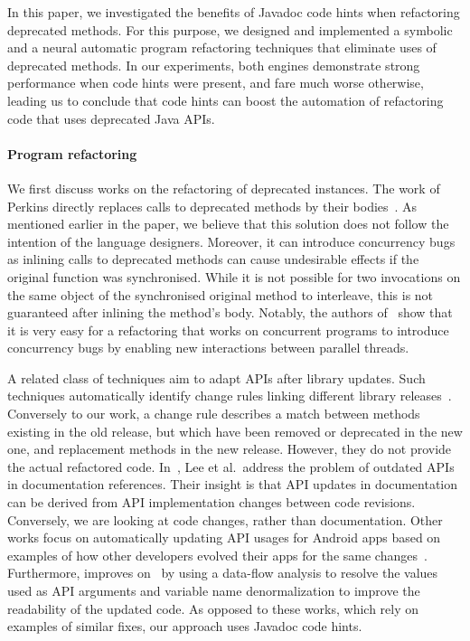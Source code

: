 \documentclass[conference]{IEEEtran}
\begin{document}
In this paper, we investigated the benefits of Javadoc code hints when
refactoring deprecated methods.  For this purpose, we designed and
implemented a symbolic and a neural automatic program refactoring techniques
that eliminate uses of deprecated methods.  In our experiments, both engines
demonstrate strong performance when code hints were present, and fare much
worse otherwise, leading us to conclude that code hints can boost the
automation of refactoring code that uses deprecated Java APIs.

\paragraph{Program refactoring}

We first discuss works on the refactoring of deprecated instances.  The work
of Perkins directly replaces calls to deprecated methods by their
bodies~\cite{DBLP:conf/paste/Perkins05}.  As mentioned earlier in the paper,
we believe that this solution does not follow the intention of the language
designers.  Moreover, it can introduce concurrency bugs as inlining calls to
deprecated methods can cause undesirable effects if the original function
was synchronised.  While it is not possible for two invocations on the same
object of the synchronised original method to interleave, this is not
guaranteed after inlining the method's body.  Notably, the authors
of~\cite{10.1007/978-3-642-14107-2_11} show that it is very easy for a
refactoring that works on concurrent programs to introduce concurrency bugs
by enabling new interactions between parallel threads.


A related class of techniques aim to adapt APIs after library updates.  Such
techniques automatically identify change rules linking different library
releases~\cite{DBLP:conf/icse/WuGAK10,DBLP:conf/kbse/Huang0PW021}. 
Conversely to our work, a change rule describes a match between methods
existing in the old release, but which have been removed or deprecated in
the new one, and replacement methods in the new release.  However, they do
not provide the actual refactored code. 
In~\cite{DBLP:journals/tse/LeeWCK21}, Lee et al.~address the problem of
outdated APIs in documentation references.  Their insight is that API
updates in documentation can be derived from API implementation changes
between code revisions.  Conversely, we are looking at code changes, rather
than documentation.  Other works focus on automatically updating API usages
for Android apps based on examples of how other developers evolved their
apps for the same
changes~\cite{DBLP:conf/issta/FazziniXO19,DBLP:conf/iwpc/HaryonoTKSML0J20}. 
Furthermore, \cite{DBLP:journals/ese/HaryonoTLJLKSM22} improves
on~\cite{DBLP:conf/iwpc/HaryonoTKSML0J20} by using a data-flow analysis to
resolve the values used as API arguments and variable name denormalization
to improve the readability of the updated code.  As opposed to these works,
which rely on examples of similar fixes, our approach uses Javadoc code
hints.
\end{document}
